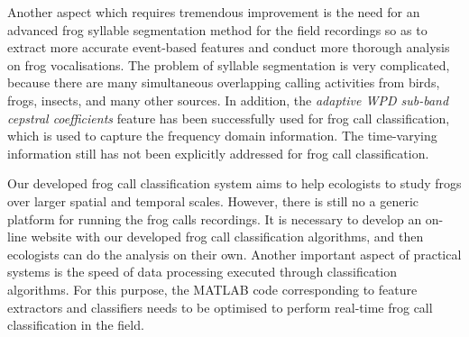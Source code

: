 Another aspect which requires tremendous improvement is the need for an advanced frog syllable segmentation method for the field recordings so as to extract more accurate event-based features and conduct more thorough analysis on frog vocalisations. The problem of syllable segmentation is very complicated, because there are many simultaneous overlapping calling activities from birds, frogs, insects, and many other sources. In addition, the \textit{adaptive WPD sub-band cepstral coefficients} feature has been successfully used for frog call classification, which is used to capture the frequency domain information. The time-varying information still has not been explicitly addressed for frog call classification. 

Our developed frog call classification system aims to help ecologists to study frogs over larger spatial and temporal scales. However, there is still no a generic platform for running the frog calls recordings. It is necessary to develop an on-line website with our developed frog call classification algorithms, and then ecologists can do the analysis on their own. Another important aspect of practical systems is the speed of data processing executed through classification algorithms. For this purpose, the MATLAB code corresponding to feature extractors and classifiers needs to be optimised to perform real-time frog call classification in the field.



